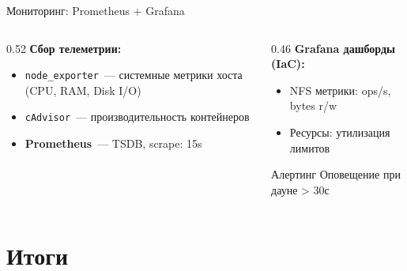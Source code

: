 \documentclass[aspectratio=169,14pt]{beamer}
\begin{document}
	\begin{frame}{Мониторинг: Prometheus + Grafana}
		\begin{columns}[T]
			\begin{column}{0.52\textwidth}
				\textbf{Сбор телеметрии:}
				\begin{itemize}\footnotesize
					\item \texttt{node\_exporter}~— системные метрики хоста (CPU, RAM, Disk I/O)
					\item \texttt{cAdvisor}~— производительность контейнеров
					\item \textbf{Prometheus}~— TSDB, scrape: 15s
				\end{itemize}
			\end{column}
			\begin{column}{0.46\textwidth}
				\textbf{Grafana дашборды (IaC):}
				\begin{itemize}\footnotesize
					\item NFS метрики: ops/s, bytes r/w
					\item Ресурсы: утилизация лимитов
				\end{itemize}
				\begin{alertblock}{Алертинг}
					\centering\small
					Оповещение при дауне > 30с
				\end{alertblock}
			\end{column}
		\end{columns}
	\end{frame}
	
	\section{Итоги}
	
\end{document}
